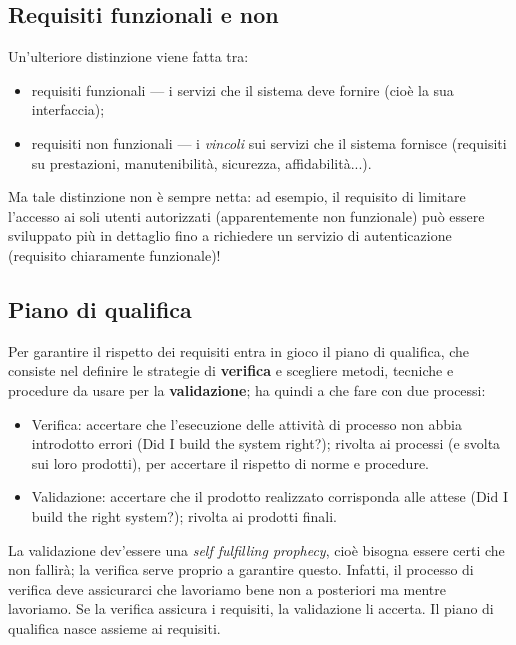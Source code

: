 \documentclass[a4paper]{article}
\begin{document}
		
	\subsection{Requisiti funzionali e non}

		
Un'ulteriore distinzione viene fatta tra:
		
	\begin{itemize}
		
			
	\item requisiti funzionali --- i servizi che il sistema deve fornire (cioè la sua interfaccia);
			
	\item requisiti non funzionali --- i \emph{vincoli} sui servizi che il sistema fornisce (requisiti su prestazioni, manutenibilità, sicurezza, affidabilità...).
		
	\end{itemize}

		
Ma tale distinzione non è sempre netta: ad esempio, il requisito di limitare l'accesso ai soli utenti autorizzati (apparentemente non funzionale) può essere sviluppato più in dettaglio fino a richiedere un servizio di autenticazione (requisito chiaramente funzionale)!

		
	\subsection{Piano di qualifica}

		
Per garantire il rispetto dei requisiti entra in gioco il piano di qualifica, che consiste nel definire le strategie di \textbf{verifica} e scegliere metodi, tecniche e procedure da usare per la \textbf{validazione}; ha quindi a che fare con due processi:
		
	\begin{itemize}
		
			
	\item Verifica: accertare che l'esecuzione delle attività di processo non abbia introdotto errori (Did I build the system right?); rivolta ai processi (e svolta sui loro prodotti), per accertare il rispetto di norme e procedure.
			
	\item Validazione: accertare che il prodotto realizzato corrisponda alle attese (Did I build the right system?); rivolta ai prodotti finali.
		
	\end{itemize}

		
La validazione dev'essere una \emph{self fulfilling prophecy}, cioè bisogna essere certi che non fallirà; la verifica serve proprio a garantire questo. Infatti, il processo di verifica deve assicurarci che lavoriamo bene non a posteriori ma mentre lavoriamo. Se la verifica assicura i requisiti, la validazione li accerta. Il piano di qualifica nasce assieme ai requisiti.
\end{document}
